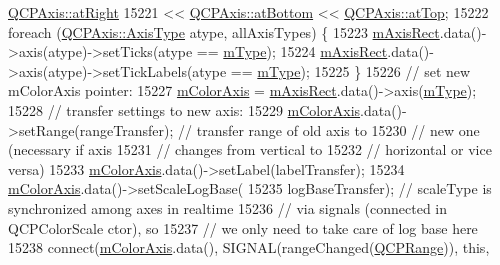 \begin{DoxyCode}
      \hyperlink{class_q_c_p_axis_ae2bcc1728b382f10f064612b368bc18aadf5509f7d29199ef2f263b1dd224b345}{QCPAxis::atRight}
15221                                    << \hyperlink{class_q_c_p_axis_ae2bcc1728b382f10f064612b368bc18aa220d68888516b6c3b493d144f1ba438f}{QCPAxis::atBottom} << 
      \hyperlink{class_q_c_p_axis_ae2bcc1728b382f10f064612b368bc18aac0ece2b680d3f545e701f75af1655977}{QCPAxis::atTop};
15222     \textcolor{keywordflow}{foreach} (\hyperlink{class_q_c_p_axis_ae2bcc1728b382f10f064612b368bc18a}{QCPAxis::AxisType} atype, allAxisTypes) \{
15223       \hyperlink{class_q_c_p_color_scale_a6e37f7d49cd614dc50ef1caae60461b9}{mAxisRect}.data()->axis(atype)->setTicks(atype == \hyperlink{class_q_c_p_color_scale_a7d47ed4ab76f38e50164e9d77fe33789}{mType});
15224       \hyperlink{class_q_c_p_color_scale_a6e37f7d49cd614dc50ef1caae60461b9}{mAxisRect}.data()->axis(atype)->setTickLabels(atype == \hyperlink{class_q_c_p_color_scale_a7d47ed4ab76f38e50164e9d77fe33789}{mType});
15225     \}
15226     \textcolor{comment}{// set new mColorAxis pointer:}
15227     \hyperlink{class_q_c_p_color_scale_a2efbc90fd31898fe05d2b74a8422b1d5}{mColorAxis} = \hyperlink{class_q_c_p_color_scale_a6e37f7d49cd614dc50ef1caae60461b9}{mAxisRect}.data()->axis(\hyperlink{class_q_c_p_color_scale_a7d47ed4ab76f38e50164e9d77fe33789}{mType});
15228     \textcolor{comment}{// transfer settings to new axis:}
15229     \hyperlink{class_q_c_p_color_scale_a2efbc90fd31898fe05d2b74a8422b1d5}{mColorAxis}.data()->setRange(rangeTransfer); \textcolor{comment}{// transfer range of old axis to}
15230                                                 \textcolor{comment}{// new one (necessary if axis}
15231                                                 \textcolor{comment}{// changes from vertical to}
15232                                                 \textcolor{comment}{// horizontal or vice versa)}
15233     \hyperlink{class_q_c_p_color_scale_a2efbc90fd31898fe05d2b74a8422b1d5}{mColorAxis}.data()->setLabel(labelTransfer);
15234     \hyperlink{class_q_c_p_color_scale_a2efbc90fd31898fe05d2b74a8422b1d5}{mColorAxis}.data()->setScaleLogBase(
15235         logBaseTransfer); \textcolor{comment}{// scaleType is synchronized among axes in realtime}
15236                           \textcolor{comment}{// via signals (connected in QCPColorScale ctor), so}
15237                           \textcolor{comment}{// we only need to take care of log base here}
15238     connect(\hyperlink{class_q_c_p_color_scale_a2efbc90fd31898fe05d2b74a8422b1d5}{mColorAxis}.data(), SIGNAL(rangeChanged(\hyperlink{class_q_c_p_range}{QCPRange})), \textcolor{keyword}{this},

\end{DoxyCode}
